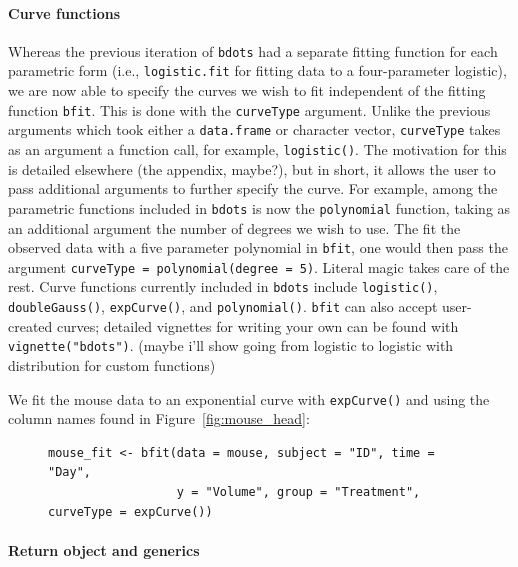 \documentclass{article}
\newcommand{\xt}{\texttt}%
\begin{document}
\paragraph{Curve functions} Whereas the previous iteration of \xt{bdots} had a separate fitting function for each parametric form (i.e., \xt{logistic.fit} for fitting data to a four-parameter logistic), we are now able to specify the curves we wish to fit independent of the fitting function \xt{bfit}. This is done with the \xt{curveType} argument. Unlike the previous arguments which took either a \xt{data.frame} or character  vector, \xt{curveType} takes as an argument a function call, for example, \xt{logistic()}. The motivation for this is detailed elsewhere (the appendix, maybe?), but in short, it allows the user to pass additional arguments to further specify the curve. For example, among the parametric functions included in \xt{bdots} is now the \xt{polynomial} function, taking as an additional argument the number of degrees we wish to use. The fit the observed data with a five parameter polynomial in \xt{bfit}, one would then pass the argument \xt{curveType = polynomial(degree = 5)}. Literal magic takes care of the rest. Curve functions currently included in \xt{bdots} include \xt{logistic()}, \xt{doubleGauss()}, \xt{expCurve()}, and \xt{polynomial()}. \xt{bfit} can also accept user-created curves; detailed vignettes for writing your own can be found with \xt{vignette("bdots")}. (maybe i'll show going from logistic to logistic with distribution for custom functions)

We fit the mouse data to an exponential curve with \xt{expCurve()} and using the column names found in Figure~\ref{fig:mouse_head}:

\begin{singlespace}
\begin{figure}[H]
\centering
\begin{BVerbatim}
mouse_fit <- bfit(data = mouse, subject = "ID", time = "Day", 
                  y = "Volume", group = "Treatment", curveType = expCurve())
\end{BVerbatim}
\label{fig:bfit_example}
\end{figure}
\end{singlespace}


\paragraph{Return object and generics}
\end{document}
